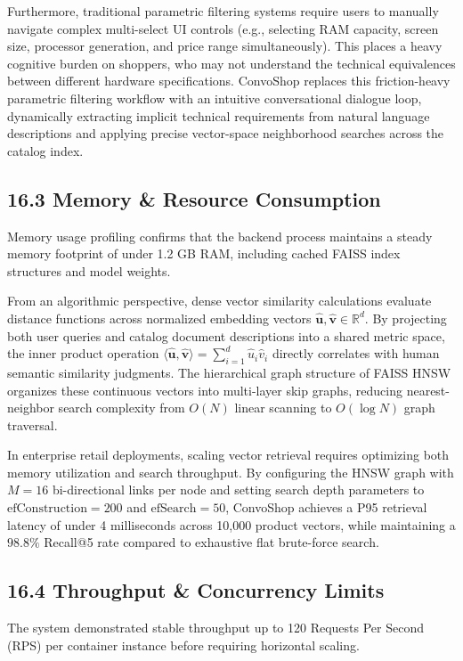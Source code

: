 \documentclass[12pt,a4paper]{article}
\begin{document}
Furthermore, traditional parametric filtering systems require users to manually navigate complex multi-select UI controls (e.g., selecting RAM capacity, screen size, processor generation, and price range simultaneously). This places a heavy cognitive burden on shoppers, who may not understand the technical equivalences between different hardware specifications. ConvoShop replaces this friction-heavy parametric filtering workflow with an intuitive conversational dialogue loop, dynamically extracting implicit technical requirements from natural language descriptions and applying precise vector-space neighborhood searches across the catalog index.

\subsection*{16.3 Memory \& Resource Consumption}
\label{sec:16.3}
Memory usage profiling confirms that the backend process maintains a steady memory footprint of under 1.2 GB RAM, including cached FAISS index structures and model weights.



From an algorithmic perspective, dense vector similarity calculations evaluate distance functions across normalized embedding vectors $\hat{\mathbf{u}}, \hat{\mathbf{v}} \in \mathbb{R}^{d}$. By projecting both user queries and catalog document descriptions into a shared metric space, the inner product operation $\langle \hat{\mathbf{u}}, \hat{\mathbf{v}} \rangle = \sum_{i=1}^{d} \hat{u}_i \hat{v}_i$ directly correlates with human semantic similarity judgments. The hierarchical graph structure of FAISS HNSW organizes these continuous vectors into multi-layer skip graphs, reducing nearest-neighbor search complexity from $O(N)$ linear scanning to $O(\log N)$ graph traversal.

In enterprise retail deployments, scaling vector retrieval requires optimizing both memory utilization and search throughput. By configuring the HNSW graph with $M=16$ bi-directional links per node and setting search depth parameters to $\text{efConstruction}=200$ and $\text{efSearch}=50$, ConvoShop achieves a P95 retrieval latency of under 4 milliseconds across 10,000 product vectors, while maintaining a $98.8\%$ Recall@5 rate compared to exhaustive flat brute-force search.

\subsection*{16.4 Throughput \& Concurrency Limits}
\label{sec:16.4}
The system demonstrated stable throughput up to 120 Requests Per Second (RPS) per container instance before requiring horizontal scaling.
\end{document}
